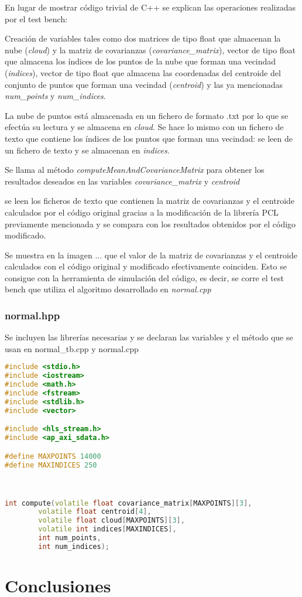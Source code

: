 En lugar de mostrar código trivial de C++ se explican las operaciones realizadas por el test bench:

\begin{list}{•}
\item Creación de variables tales como dos matrices de tipo float que almacenan la nube (\textit{cloud}) y la matriz de covarianzas (\textit{covariance\_matrix}), vector de tipo float que almacena los índices de los puntos de la nube que forman una vecindad (\textit{indices}), vector de tipo float que almacena las coordenadas del centroide del conjunto de puntos que forman una vecindad (\textit{centroid}) y las ya mencionadas \textit{num\_points} y \textit{num\_indices}.

\item La nube de puntos está almacenada en un fichero de formato .txt por lo que se efectúa su lectura y se almacena en \textit{cloud}. Se hace lo mismo con un fichero de texto que contiene los índices de los puntos que forman una vecindad: se leen de un fichero de texto y se almacenan en \textit{indices}.

\item Se llama al método \textit{computeMeanAndCovarianceMatrix} para obtener los resultados deseados en las variables \textit{covariance\_matrix} y \textit{centroid}

\item se leen los ficheros de texto que contienen la matriz de covarianzas y el centroide calculados por el código original gracias a la modificación de la librería PCL previamente mencionada y se compara con los resultados obtenidos por el código modificado.
\end{list}

Se muestra en la imagen ... que el valor de la matriz de covarianzas y el centroide calculados con el código original y modificado efectivamente coinciden.
Esto se consigue con la herramienta de simulación del código, es decir, se corre el test bench que utiliza el algoritmo desarrollado en \textit{normal.cpp}

\subsubsection{normal.hpp}

Se incluyen las librerías necesarias y se declaran las variables y el método que se usan en normal\_tb.cpp y normal.cpp

\begin{lstlisting}[language=C++,breaklines]
#include <stdio.h>
#include <iostream>
#include <math.h>
#include <fstream>
#include <stdlib.h>
#include <vector>

#include <hls_stream.h>
#include <ap_axi_sdata.h>

#define MAXPOINTS 14000
#define MAXINDICES 250



int compute(volatile float covariance_matrix[MAXPOINTS][3],
		volatile float centroid[4],
		volatile float cloud[MAXPOINTS][3],
		volatile int indices[MAXINDICES],
		int num_points,
		int num_indices);
\end{lstlisting}

\section{Conclusiones}


